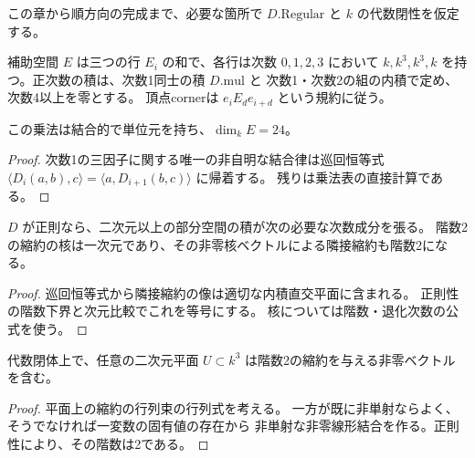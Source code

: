 この章から順方向の完成まで、必要な箇所で $D.\mathrm{Regular}$ と $k$ の代数閉性を仮定する。

\begin{definition}[24次元の補助乗法]\label{def:auxiliary}
\leanok
{}
補助空間 $E$ は三つの行 $E_i$ の和で、各行は次数 $0,1,2,3$ において
$k,k^3,k^3,k$ を持つ。正次数の積は、次数1同士の積 $D.\mathrm{mul}$ と
次数1・次数2の組の内積で定め、次数4以上を零とする。
頂点cornerは $e_iE_d e_{i+d}$ という規約に従う。
\end{definition}

\begin{lemma}[補助乗法の法則]\label{lem:auxiliary-laws}
\leanok
{}
この乗法は結合的で単位元を持ち、$\dim_k E=24$。
\end{lemma}
\begin{proof}\leanok
次数1の三因子に関する唯一の非自明な結合律は巡回恒等式
$\langle D_i(a,b),c\rangle=\langle a,D_{i+1}(b,c)\rangle$ に帰着する。
残りは乗法表の直接計算である。
\end{proof}

\begin{lemma}[正則縮約の像と核]\label{lem:rank}
\leanok
{}
$D$ が正則なら、二次元以上の部分空間の積が次の必要な次数成分を張る。
階数2の縮約の核は一次元であり、その非零核ベクトルによる隣接縮約も階数2になる。
\end{lemma}
\begin{proof}\leanok
巡回恒等式から隣接縮約の像は適切な内積直交平面に含まれる。
正則性の階数下界と次元比較でこれを等号にする。
核については階数・退化次数の公式を使う。
\end{proof}

\begin{lemma}[平面にある階数2の元]\label{lem:pencil}
\leanok
{}
代数閉体上で、任意の二次元平面 $U\subset k^3$ は階数2の縮約を与える非零ベクトルを含む。
\end{lemma}
\begin{proof}\leanok
平面上の縮約の行列束の行列式を考える。
一方が既に非単射ならよく、そうでなければ一変数の固有値の存在から
非単射な非零線形結合を作る。正則性により、その階数は2である。
\end{proof}

